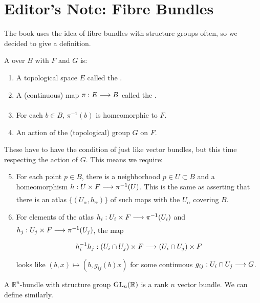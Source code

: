 \documentclass[../main]{subfiles}
\begin{document}
\section{Editor's Note: Fibre Bundles}\label{sec:2.2}
The book uses the idea of fibre bundles with structure groups often, so we decided to give a definition. 

\begin{definition}
A  over $B$ with  $F$ and  $G$ is:
\begin{enumerate}[label = \arabic*)]
    \item A topological space $E$ called the .
    \item A (continuous) map $\pi:E\varrightarrow{} B$ called the .
    \item For each $b\in B$, $\pi^{-1}(b)$ is homeomorphic to $F$.
    \item An action of the (topological) group $G$ on $F$.
\end{enumerate}
These have to have the condition of  just like vector bundles, but this time respecting the action of $G$. This means we require:
\begin{enumerate}[label = \arabic*)]\setcounter{enumi}{4}
    \item For each point $p\in B$, there is a neighborhood $p\in U\subset B$ and a homeomorphism $h:U\times F\varrightarrow{} \pi^{-1}(U)$. This is the same as asserting that there is an atlas $\{(U_\alpha,h_\alpha)\}$ of such maps with the $U_\alpha$ covering $B$.
    \item For elements of the atlas $h_i:U_i\times F\varrightarrow{} \pi^{-1}(U_i)$ and \newline$h_j:U_j\times F\varrightarrow{} \pi^{-1}(U_j)$,  the map \[h_i^{-1}h_j:(U_i\cap U_j)\times F\varrightarrow{}(U_i\cap U_j)\times F\]  looks like $(b,x)\mapsto (b, g_{ij}(b)x) $ for some continuous $g_{ij}: U_i\cap U_j \varrightarrow{} G$.
\end{enumerate}

\end{definition}

\begin{note}
A $\mathbb{R}^n$-bundle with structure group $\operatorname{GL}_n(\mathbb{R})$ is a rank $n$ vector bundle. We can define  similarly.
\end{note}
\end{document}

